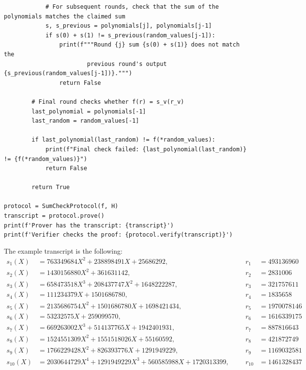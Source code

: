 \documentclass{gkr-template}
\begin{document}
\begin{verbatim}
            # For subsequent rounds, check that the sum of the polynomials matches the claimed sum
            s, s_previous = polynomials[j], polynomials[j-1]
            if s(0) + s(1) != s_previous(random_values[j-1]):
                print(f"""Round {j} sum {s(0) + s(1)} does not match the 
                        previous round's output {s_previous(random_values[j-1])}.""")
                return False

        # Final round checks whether f(r) = s_v(r_v)
        last_polynomial = polynomials[-1]
        last_random = random_values[-1]

        if last_polynomial(last_random) != f(*random_values):
            print(f"Final check failed: {last_polynomial(last_random)} != {f(*random_values)}")
            return False
        
        return True

protocol = SumCheckProtocol(f, H)
transcript = protocol.prove()
print(f'Prover has the transcript: {transcript}')
print(f'Verifier checks the proof: {protocol.verify(transcript)}')
\end{verbatim}


The example transcript is the following:
\begin{align*}
    s_1(X) &= 763349684X^2 + 238898491X + 25686292, &&& r_1 &= 493136960 \\
    s_2(X) &= 1430156880X^2 + 361631142, &&& r_2 &= 2831006 \\
    s_3(X) &= 658473518X^3 + 208437747X^2 + 1648222287, &&& r_3 &= 321757611 \\
    s_4(X) &= 111234379X + 1501686780, &&& r_4 &= 1835658 \\
    s_5(X) &= 2135686754X^2 + 1501686780X + 1698421434, &&& r_5 &= 1970078146 \\
    s_6(X) &= 53232575X + 259099570, &&& r_6 &= 1616339175 \\
    s_7(X) &= 669263002X^3 + 514137765X + 1942401931, &&& r_7 &= 887816643 \\
    s_8(X) &= 1524551309X^2 + 1551518026X + 55160592, &&& r_8 &= 421872749 \\
    s_9(X) &= 1766229428X^2 + 826393776X + 1291949229, &&& r_9 &= 1169032581 \\
    s_{10}(X) &= 2030644729X^4 + 1291949229X^3 + 560585988X + 1720313399, &&& r_{10} &= 1461328437
\end{align*}
\end{document}
